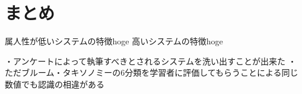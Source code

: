 \section{まとめ}
属人性が低いシステムの特徴hoge
高いシステムの特徴hoge

・アンケートによって執筆すべきとされるシステムを洗い出すことが出来た
・ただブルーム・タキソノミーの6分類を学習者に評価してもらうことによる同じ数値でも認識の相違がある




